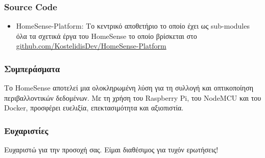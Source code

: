 \documentclass{beamer}
\begin{document}
\begin{frame}
\frametitle{Source Code}
\begin{itemize}
	\item HomeSense-Platform: Το κεντρικό αποθετήριο το οποίο έχει ως sub-modules όλα τα σχετικά έργα του HomeSense το οποίο βρίσκεται στο \url{github.com/KostelidisDev/HomeSense-Platform}
\end{itemize}
\end{frame}

\begin{frame}
\frametitle{Συμπεράσματα}
Το HomeSense αποτελεί μια ολοκληρωμένη λύση για τη συλλογή και οπτικοποίηση περιβαλλοντικών δεδομένων. 
Με τη χρήση του Raspberry Pi, του NodeMCU και του Docker, προσφέρει ευελιξία, επεκτασιμότητα και αξιοπιστία.
\end{frame}

\begin{frame}
\frametitle{Ευχαριστίες}
Ευχαριστώ για την προσοχή σας. Είμαι διαθέσιμος για τυχόν ερωτήσεις!
\end{frame}
\end{document}
